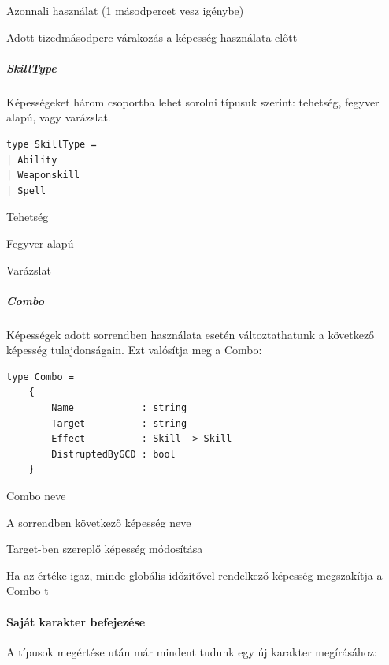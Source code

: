 \documentclass[12pt]{article}
\begin{document}
\begin{description}[align=left,labelwidth=2.5cm]
	\item [Instant] Azonnali használat (1 másodpercet vesz igénybe)
	\item [Time] Adott tizedmásodperc várakozás a képesség használata előtt
\end{description}

\subparagraph{SkillType}

Képességeket három csoportba lehet sorolni típusuk szerint: tehetség, fegyver alapú, vagy varázslat.

\begin{lstlisting}
type SkillType =
| Ability
| Weaponskill
| Spell
\end{lstlisting}

\begin{description}[align=left,labelwidth=2.5cm]
	\item [Ability] Tehetség
	\item [Weaponskill] Fegyver alapú
	\item [Spell] Varázslat
\end{description}

\subparagraph{Combo}

Képességek adott sorrendben használata esetén változtathatunk a következő képesség tulajdonságain. Ezt valósítja meg a Combo:

\begin{lstlisting}
type Combo =
	{
		Name            : string
		Target          : string
		Effect          : Skill -> Skill
		DistruptedByGCD : bool
	}
\end{lstlisting}

\begin{description}[align=left,labelwidth=3cm]
	\item [Name] Combo neve
	\item [Target] A sorrendben következő képesség neve
	\item [Effect] Target-ben szereplő képesség módosítása
	\item [DistruptedByGCD] Ha az értéke igaz, minde globális időzítővel rendelkező képesség megszakítja a Combo-t
\end{description}

\paragraph{Saját karakter befejezése}

A típusok megértése után már mindent tudunk egy új karakter megírásához:
	
\end{document}
